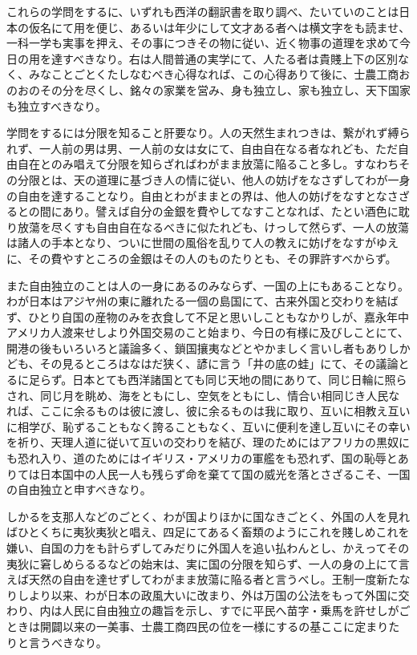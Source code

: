 \documentclass[a4paper, platex, dvipdfmx]{jsarticle}
\begin{document}
これらの学問をするに、いずれも西洋の翻訳書を取り調べ、たいていのことは日本の仮名にて用を便じ、あるいは年少にして文才ある者へは横文字をも読ませ、一科一学も実事を押え、その事につきその物に従い、近く物事の道理を求めて今日の用を達すべきなり。右は人間普通の実学にて、人たる者は貴賤上下の区別なく、みなことごとくたしなむべき心得なれば、この心得ありて後に、士農工商おのおのその分を尽くし、銘々の家業を営み、身も独立し、家も独立し、天下国家も独立すべきなり。

学問をするには分限を知ること肝要なり。人の天然生まれつきは、繋がれず縛られず、一人前の男は男、一人前の女は女にて、自由自在なる者なれども、ただ自由自在とのみ唱えて分限を知らざればわがまま放蕩に陥ること多し。すなわちその分限とは、天の道理に基づき人の情に従い、他人の妨げをなさずしてわが一身の自由を達することなり。自由とわがままとの界は、他人の妨げをなすとなさざるとの間にあり。譬えば自分の金銀を費やしてなすことなれば、たとい酒色に耽り放蕩を尽くすも自由自在なるべきに似たれども、けっして然らず、一人の放蕩は諸人の手本となり、ついに世間の風俗を乱りて人の教えに妨げをなすがゆえに、その費やすところの金銀はその人のものたりとも、その罪許すべからず。

また自由独立のことは人の一身にあるのみならず、一国の上にもあることなり。わが日本はアジヤ州の東に離れたる一個の島国にて、古来外国と交わりを結ばず、ひとり自国の産物のみを衣食して不足と思いしこともなかりしが、嘉永年中アメリカ人渡来せしより外国交易のこと始まり、今日の有様に及びしことにて、開港の後もいろいろと議論多く、鎖国攘夷などとやかましく言いし者もありしかども、その見るところはなはだ狭く、諺に言う「井の底の蛙」にて、その議論とるに足らず。日本とても西洋諸国とても同じ天地の間にありて、同じ日輪に照らされ、同じ月を眺め、海をともにし、空気をともにし、情合い相同じき人民なれば、ここに余るものは彼に渡し、彼に余るものは我に取り、互いに相教え互いに相学び、恥ずることもなく誇ることもなく、互いに便利を達し互いにその幸いを祈り、天理人道に従いて互いの交わりを結び、理のためにはアフリカの黒奴にも恐れ入り、道のためにはイギリス・アメリカの軍艦をも恐れず、国の恥辱とありては日本国中の人民一人も残らず命を棄てて国の威光を落とさざるこそ、一国の自由独立と申すべきなり。

しかるを支那人などのごとく、わが国よりほかに国なきごとく、外国の人を見ればひとくちに夷狄夷狄と唱え、四足にてあるく畜類のようにこれを賤しめこれを嫌い、自国の力をも計らずしてみだりに外国人を追い払わんとし、かえってその夷狄に窘しめらるるなどの始末は、実に国の分限を知らず、一人の身の上にて言えば天然の自由を達せずしてわがまま放蕩に陥る者と言うべし。王制一度新たなりしより以来、わが日本の政風大いに改まり、外は万国の公法をもって外国に交わり、内は人民に自由独立の趣旨を示し、すでに平民へ苗字・乗馬を許せしがごときは開闢以来の一美事、士農工商四民の位を一様にするの基ここに定まりたりと言うべきなり。
\end{document}
